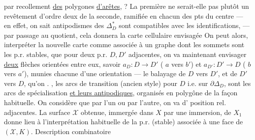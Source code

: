 par recollement \uline{des} polygones \uline{d'arêtes}, ?  La première ne serait-elle pas plutôt un revêtement d'ordre deux de la seconde, ramifiée en chacun des pts du centre --- en effet, on sait   antipodismes des $\Delta_D^*$ sont compatibles avec les identifications, --- par passage au quotient, cela donnera  la carte cellulaire envisagée\unsure{\ldots} On peut alors,    interpréter la nouvelle carte comme associée à un graphe  dont les sommets sont les p.r. stables, que pour deux p.r. $D,D'$ adjacentes, on va maintenant envisager \uline{deux} flèches orientées entre eux, savoir $a_D:D\longrightarrow D'$ ( $a$ vers $b'$) et $a_{D'}:D'\longrightarrow D$ ( $b$ vers $a'$), munies chacune d'une orientation --- le balayage de $D$ vers $D'$, et de $D'$ vers $D$, qu'on .
, les arcs de transition (ancien style) pour $D$ i.e. sur $\partial\Delta_D$, sont les arcs de spécialisation \uline{et leurs antipodiques}, organisés en polygône de la façon habituelle. On considère que par l'un ou par l'autre, on va d' position rel. adjacentes.
La surface $\mathcal X$ obtenue, immergée dans $X$ par une immersion,   de $X_1$  donne lieu à  l'interprétation habituelle de la p.r. (stable) associée à une face de $(\mathcal X,K)$.
Description combinatoire
